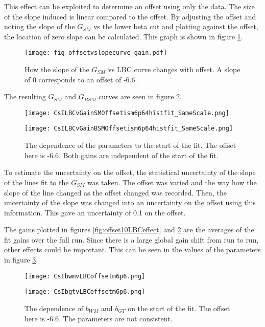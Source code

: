 \documentclass[../MaxHughesThesis.tex]{subfiles}
\begin{document}
This effect can be exploited to determine an offset using only the data. 
The size of the slope induced is linear compared to the offset. %
By adjusting the offset and noting the slope of the $G_{SM}$ vs the lower beta cut and plotting against the offset, the location of zero slope can be calculated.
This graph is shown in figure \ref{fig:slopevoffset}.
\begin{figure}[!htb]
	\centerline{\texttt{[image: fig\_offsetvslopecurve\_gain.pdf]}}
	\caption{How the slope of the $G_{SM}$ vs LBC curve changes with offset.
		 A slope of 0 corresponds to an offset of -6.6.}
	\label{fig:slopevoffset}
\end{figure}
The resulting $G_{SM}$ and $G_{BSM}$ curves are seen in figure \ref{fig:offset0LBCeffect}.

\begin{figure}
    \centering
    \begin{minipage}{0.50\textwidth}
        \centerline{\texttt{[image: CsILBCvGainSMOffsetism6p64histfit\_SameScale.png]}}
    \end{minipage}\hfill
    \begin{minipage}{0.50\textwidth}
        \centerline{\texttt{[image: CsILBCvGainBSMOffsetism6p64histfit\_SameScale.png]}}
    \end{minipage}
    \caption{The dependence of the parameters to the start of the fit.
	     The offset here is -6.6.
    	     Both gains are independent of the start of the fit.}
    \label{fig:offset0LBCeffect}
\end{figure}

To estimate the uncertainty on the offset, the statistical uncertainty of the slope of the lines fit to the $G_{SM}$  was taken.
The offset was varied and the way how the slope of the line changed as the offset changed was recorded.
Then, the uncertainty of the slope was changed into an uncertainty on the offset using this information.
This gave an uncertainty of 0.1 on the offset.

The gains plotted in figures \ref{fig:offset10LBCeffect} and \ref{fig:offset0LBCeffect} are the averages of the fit gains over the full run. 
Since there is a large global gain shift from run to run, other effects could be important. 
This can be seen in the values of the parameters in figure \ref{fig:lbcvals}.

\begin{figure}
    \centering
    \begin{minipage}{0.50\textwidth}
        \centerline{\texttt{[image: CsIbwmvLBCoffsetm6p6.png]}}
    \end{minipage}\hfill
    \begin{minipage}{0.50\textwidth}
        \centerline{\texttt{[image: CsIbgtvLBCoffsetm6p6.png]}}
    \end{minipage}
    \caption{The dependence of $b_{WM}$ and $b_{GT}$ on the start of the fit.
	     The offset here is -6.6.
   	     The parameters are not consistent.}
   \label{fig:lbcvals}
\end{figure}
\end{document}
